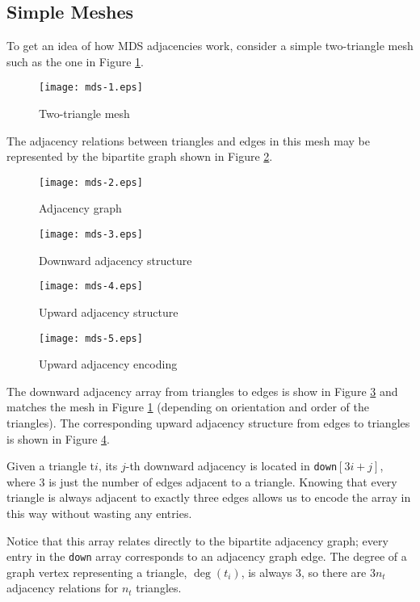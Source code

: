 \documentclass{article}
\begin{document}
\subsection{Simple Meshes}
\label{sec:simple}

To get an idea of how MDS adjacencies work, consider a simple two-triangle
mesh such as the one in Figure \ref{fig:2tri}.

\begin{figure}[ht!]
\centering
\texttt{[image: mds-1.eps]}
\caption{Two-triangle mesh}
\label{fig:2tri}
\end{figure}

The adjacency relations between triangles and edges in this mesh may be
represented by the bipartite graph shown in Figure \ref{fig:bipart}.

\begin{figure}[ht!]
\centering
\texttt{[image: mds-2.eps]}
\caption{Adjacency graph}
\label{fig:bipart}
\end{figure}

\begin{figure}[ht!]
\centering
\texttt{[image: mds-3.eps]}
\caption{Downward adjacency structure}
\label{fig:down}
\end{figure}

\begin{figure}[ht!]
\centering
\texttt{[image: mds-4.eps]}
\caption{Upward adjacency structure}
\label{fig:up}
\end{figure}

\begin{figure}[ht!]
\centering
\texttt{[image: mds-5.eps]}
\caption{Upward adjacency encoding}
\label{fig:upn}
\end{figure}

The downward adjacency array from triangles to edges
is show in Figure \ref{fig:down} and matches the mesh
in Figure \ref{fig:2tri}
(depending on orientation and order of the triangles).
The corresponding upward adjacency structure from
edges to triangles is shown in Figure \ref{fig:up}.

Given a triangle t$i$, its $j$-th downward adjacency
is located in \texttt{down}$[3i + j]$,
where 3 is just the number of edges adjacent to a triangle.
Knowing that every triangle is always adjacent to exactly
three edges allows us to encode the array in this way
without wasting any entries.

Notice that this array relates directly to the bipartite adjacency
graph; every entry in the \texttt{down} array corresponds to an adjacency
graph edge.
The degree of a graph vertex representing a triangle, $\deg(t_i)$,
is always 3, so there are $3n_t$ adjacency relations for $n_t$ triangles.
\end{document}
